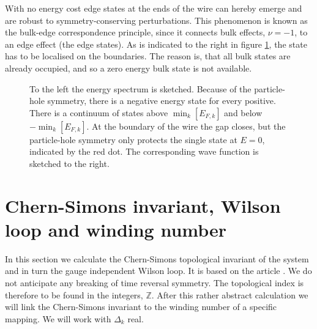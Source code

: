 With no energy cost edge states at the ends of the wire can hereby emerge and are robust to symmetry-conserving perturbations. This phenomenon is known as the bulk-edge correspondence principle, since it connects bulk effects, $\nu = -1$, to an edge effect (the edge states). As is indicated to the right in figure \ref{fig.edgestates}, the state has to be localised on the boundaries. The reason is, that all bulk states are already occupied, and so a zero energy bulk state is not available. 

\begin{figure}
\center
{}
\caption{To the left the energy spectrum is sketched. Because of the particle-hole symmetry, there is a negative energy state for every positive. There is a continuum of states above $\min_k[E_{F,k}]$ and below $-\min_k[E_{F,k}]$. At the boundary of the wire the gap closes, but the particle-hole symmetry only protects the single state at $E = 0$, indicated by the red dot. The corresponding wave function is sketched to the right.}
\label{fig.edgestates}
\end{figure}

\section{Chern-Simons invariant, Wilson loop and winding number}
\label{sec.CS1}
In this section we calculate the Chern-Simons topological invariant of the system and in turn the gauge independent Wilson loop. It is based on the article \cite{Ryu.Topology}. We do not anticipate any breaking of time reversal symmetry. The topological index is therefore to be found in the integers, $\mathbb{Z}$. After this rather abstract calculation we will link the Chern-Simons invariant to the winding number of a specific mapping. We will work with $\Delta_k$ real. 

